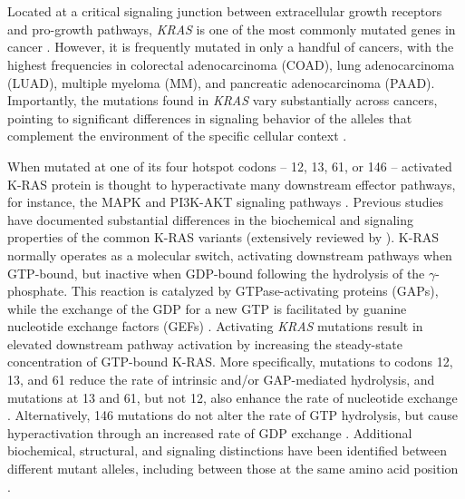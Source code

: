 \documentclass[english, 10pt, letterpaper]{article}
\newcommand{\KRAS}{\emph{KRAS}}
\newcommand{\kras}{K-RAS}
\begin{document}
\section*{}

Located at a critical signaling junction between extracellular growth receptors and pro-growth pathways, \KRAS{} is one of the most commonly mutated genes in cancer \cite{Simanshu2017, Bailey2018}.
However, it is frequently mutated in only a handful of cancers, with the highest frequencies in colorectal adenocarcinoma (COAD), lung adenocarcinoma (LUAD), multiple myeloma (MM), and pancreatic adenocarcinoma (PAAD).
Importantly, the mutations found in \KRAS{} vary substantially across cancers, pointing to significant differences in signaling behavior of the alleles that complement the environment of the specific cellular context \cite{Haigis2017, Poulin2019}.

When mutated at one of its four hotspot codons – 12, 13, 61, or 146 – activated \kras{} protein is thought to hyperactivate many downstream effector pathways, for instance, the MAPK and PI3K-AKT signaling pathways \cite{Simanshu2017}.
Previous studies have documented substantial differences in the biochemical and signaling properties of the common \kras{} variants (extensively reviewed by \cite{Miller2012, Li2018}).
\kras{} normally operates as a molecular switch, activating downstream pathways when GTP-bound, but inactive when GDP-bound following the hydrolysis of the $\gamma$-phosphate.
This reaction is catalyzed by GTPase-activating proteins (GAPs), while the exchange of the GDP for a new GTP is facilitated by guanine nucleotide exchange factors (GEFs) \cite{Barbacid1987}.
Activating \KRAS{} mutations result in elevated downstream pathway activation by increasing the steady-state concentration of GTP-bound \kras{}.
More specifically, mutations to codons 12, 13, and 61 reduce the rate of intrinsic and/or GAP-mediated hydrolysis, and mutations at 13 and 61, but not 12, also enhance the rate of nucleotide exchange \cite{Hunter2015a, Smith2013}.
Alternatively, 146 mutations do not alter the rate of GTP hydrolysis, but cause hyperactivation through an increased rate of GDP exchange \cite{Feig1988RelationshipProteins., Edkins2006, Janakiraman2010, Poulin2019}.
Additional biochemical, structural, and signaling distinctions have been identified between different mutant alleles, including between those at the same amino acid position \cite{Pershing2015, Hunter2015a, Poulin2019, Hobbs2019AtypicalCancer., Yuan2018, Kovalski2019, Ihle2012, Spoerner2004, Smith2014a, Pantsar2018}.
\end{document}
